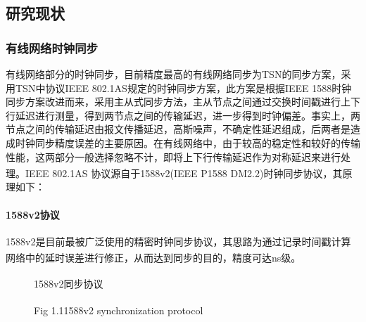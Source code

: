 \documentclass[UTF8,a4paper,12pt]{ctexart}
\numberwithin{equation}{section}
\begin{document}
	\subsection{研究现状}
	\subsubsection{有线网络时钟同步}
	
	有线网络部分的时钟同步，目前精度最高的有线网络同步为TSN的同步方案，采用TSN中协议IEEE 802.1AS规定的时钟同步方案，此方案是根据IEEE 1588时钟同步方案改进而来，采用主从式同步方法，主从节点之间通过交换时间戳进行上下行延迟进行测量，得到两节点之间的传输延迟，进一步得到时钟偏差。事实上，两节点之间的传输延迟由报文传播延迟，高斯噪声，不确定性延迟组成，后两者是造成时钟同步精度误差的主要原因。在有线网络中，由于较高的稳定性和较好的传输性能，这两部分一般选择忽略不计，即将上下行传输延迟作为对称延迟来进行处理\textsuperscript{\cite{teener2008overview}}。IEEE 802.1AS 协议源自于1588v2(IEEE P1588 DM2.2)时钟同步协议，其原理如下：
	\paragraph{1588v2协议}
	1588v2是目前最被广泛使用的精密时钟同步协议，其思路为通过记录时间戳计算网络中的延时误差进行修正，从而达到同步的目的，精度可达ns级\textsuperscript{\cite{huayang2011ieee}}。
	
	\begin{figure}[htb] 
		\caption{1588v2同步协议\textsuperscript{\cite{shereen2019next}}}
		\vspace{-10pt}
		\caption*{Fig 1.1\quad 1588v2 synchronization protocol\textsuperscript{\cite{shereen2019next}}}
	\end{figure}
	
\end{document}
